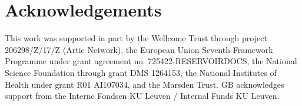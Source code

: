 \documentclass{bioinfo}
\begin{document}



\section*{Acknowledgements}

This work was supported in part by the Wellcome Trust through project 206298/Z/17/Z (Artic Network), the European Union Seventh Framework Programme under grant agreement no. 725422-RESERVOIRDOCS, the National Science Foundation through grant DMS 1264153, the National Institutes of Health under grant R01 AI107034, and the Marsden Trust.
GB acknowledges support from the Interne Fondsen KU Leuven / Internal Funds KU Leuven.




\end{document}
